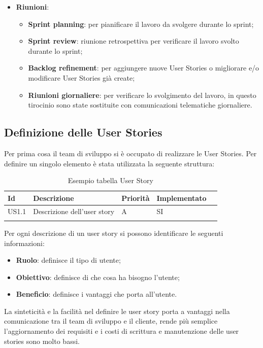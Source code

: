 \begin{itemize}
	\item \textbf{Riunioni}:
		\begin{itemize}
			\item \textbf{Sprint planning}: per pianificare il lavoro da svolgere durante lo sprint;
			\item \textbf{Sprint review}: riunione retrospettiva per verificare il lavoro svolto durante lo sprint;
			\item \textbf{Backlog refinement}: per aggiungere nuove User Stories o migliorare e/o modificare User Stories già create;
			\item \textbf{Riunioni giornaliere}: per verificare lo svolgimento del lavoro, in questo tirocinio sono state sostituite con comunicazioni telematiche giornaliere.
		\end{itemize}
\end{itemize}
\subsection{Definizione delle User Stories}
Per prima cosa il team di sviluppo si è occupato di realizzare le User Stories. Per definire un singolo elemento è stata utilizzata la seguente struttura:
\begin{longtable} {
		|>{}p{10mm}| 
		|>{}p{70mm}|
		|>{}p{15mm}|
		|>{}p{25mm}|
		>{}p{0mm}}
	\hline
	\textbf{Id} & \textbf{Descrizione} & \textbf{Priorità} & \textbf{Implementato} \\ \hline
	US1.1 & Descrizione dell'user story & A & SI \\ \hline
	\hline
	\caption{Esempio tabella User Story}
\end{longtable}
\noindent
Per ogni descrizione di un user story si possono identificare le seguenti informazioni:
\begin{itemize}
	\item \textbf{Ruolo}: definisce il tipo di utente;
	\item \textbf{Obiettivo}: definisce di che cosa ha bisogno l'utente;
	\item \textbf{Beneficio}: definisce i vantaggi che porta all'utente.
\end{itemize} 
\noindent
La sinteticità e la facilità nel definire le user story porta a vantaggi nella comunicazione tra il team di sviluppo e il cliente, rende più semplice l'aggiornamento dei requisiti e i costi di scrittura e manutenzione delle user stories sono molto bassi.

